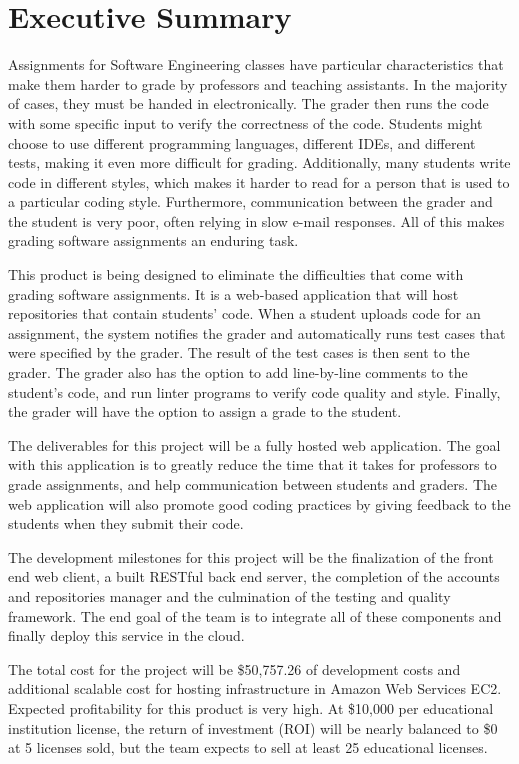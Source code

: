 \part*{Executive Summary}

Assignments for Software Engineering classes have particular characteristics
that make them harder to grade by professors and teaching assistants. In the
majority of cases, they must be handed in electronically. The grader then runs
the code with some specific input to verify the correctness of the code.
Students might choose to use different programming languages, different IDEs,
and different tests, making it even more difficult for grading. Additionally,
many students write code in different styles, which makes it harder to read for
a person that is used to a particular coding style. Furthermore, communication
between the grader and the student is very poor, often relying in slow e-mail
responses.  All of this makes grading software assignments an enduring task.

This product is being designed to eliminate the difficulties that come with
grading software assignments. It is a web-based application that will
host repositories that contain students' code. When a student uploads code
for an assignment, the system notifies the grader and automatically runs test
cases that were specified by the grader. The result of the test cases is then
sent to the grader. The grader also has the option to add line-by-line comments
to the student's code, and run linter programs to verify code quality and
style. Finally, the grader will have the option to assign a grade to the
student.

The deliverables for this project will be a fully hosted web application. The
goal with this application is to greatly reduce the time that it takes for
professors to grade assignments, and help communication between students and
graders. The web application will also promote good coding practices by giving
feedback to the students when they submit their code.

The development milestones for this project will be the finalization of the
front end web client, a built RESTful back end server, the completion of the
accounts and repositories manager and the culmination of the testing and quality
framework. The end goal of the team is to integrate all of these components and finally
deploy this service in the cloud.


The total cost for the project will be \$50,757.26 of development costs and
additional scalable cost for hosting infrastructure in Amazon Web Services EC2.
Expected profitability for this product is very high. At \$10,000 per
educational institution license, the return of investment (ROI) will be nearly
balanced to \$0 at 5 licenses sold, but the team expects to sell at least 25
educational licenses.

